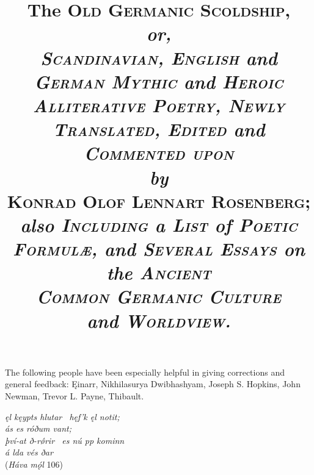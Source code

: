 \title{%
  \Huge The \textsc{Old Germanic Scoldship}, \\
  \huge\emph{or, \\
  \textsc{Scandinavian, English} and \textsc{German Mythic} and \textsc{Heroic Alliterative Poetry, Newly Translated, Edited} and \textsc{Commented upon}} \\
  \emph{by} \\
  \Huge \textsc{Konrad Olof Lennart Rosenberg}; \\ \emph{also \textsc{Including} a \textsc{List} of \textsc{Poetic Formulæ}, and \textsc{Several Essays} on the \textsc{Ancient \\ Common Germanic Culture} \\ and \textsc{Worldview}.}}

\maketitle

\newpage\thispagestyle{empty}

\begin{center} The following people have been especially helpful in giving corrections and general feedback: Ęinarr, Nikhilasurya Dwibhashyam, Joseph S. Hopkins, John Newman, Trevor L. Payne, Thibault.\end{center}

\begin{center} \emph{ęl kęypts hlutar \hld\ hęf’k ęl notit; \\
ás es róðum vant; \\
því-at ð-rǿrir \hld\ es nú pp kominn \\
á lda vés ðar} \\
(\emph{Háva mǫ́l} 106)\end{center}

\newpage\thispagestyle{empty}

\tableofcontents

\newpage


